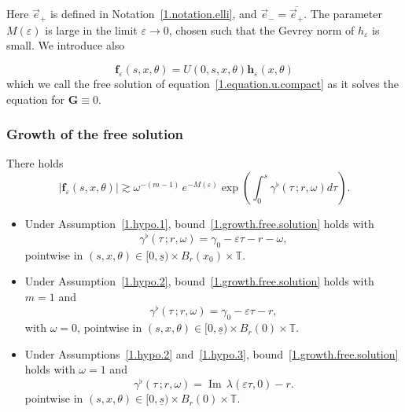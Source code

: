 \documentclass[AHL,Unicode,longabstracts,published]{cedram}
\theoremstyle{plain}
\newcommand*\e{\varepsilon}
\newcommand*\g{\gamma}
\newcommand*\f{{\mathbf f}}
\newcommand*\h{{\mathbf h}}
\newcommand*\und{\underline}
\DeclareMathOperator{\Imm}{Im}
\begin{document}
Here $\vec{e}_{+}$ is defined in Notation~\ref{1.notation.elli}, and $\vec{e}_{-} = \overline{\vec{e}_{+}}$. The parameter $M(\e)$ is large in the limit $\e\to 0$, chosen such that the Gevrey norm of $h_{\e}$ is small. We introduce also

\begin{equation}\label{1.free.solution}
\f_{\e}(s,x,\theta) = U(0,s,x,\theta) \h_{\e}(x,\theta)
\end{equation}
which we call the free solution of equation~\eqref{1.equation.u.compact} as it solves the equation for ${\mathbf G} \equiv 0$.


\subsubsection{Growth of the free solution}


\begin{lemm}\label{1.lemma.growth.free.solution}
There holds
\begin{equation}\label{1.growth.free.solution}
|\f_{\e}(s,x,\theta)| \gtrsim \omega^{-(m-1)}\,e^{-M(\e)}\exp\left(\int_{0}^{s} \g^{\flat}(\tau \,;r,\omega) d\tau \right).
\end{equation}


\begin{itemize}
\item Under Assumption~\ref{1.hypo.1}, bound~\eqref{1.growth.free.solution} holds with
\begin{equation}\label{1.bound.g.flat}
\g^{\flat}(\tau \,; r,\omega) = \g_0 - \e \tau - r - \omega,
\end{equation}
pointwise in $(s,x,\theta)\in[0,\und{s})\times B_r(x_0)\times\mathbb{T}$.

\item Under Assumption~\ref{1.hypo.2}, bound~\eqref{1.growth.free.solution} holds with $m=1$ and
\begin{equation}\label{1.bound.g.flat.bis}
\g^{\flat}(\tau \,; r,\omega) = \g_0 - \e \tau - r,
\end{equation}
with $\omega = 0$, pointwise in $(s,x,\theta)\in[0,\und{s})\times B_r(0)\times\mathbb{T}$.

\item Under Assumptions~\ref{1.hypo.2} and~\ref{1.hypo.3}, bound~\eqref{1.growth.free.solution} holds with $\omega = 1$ and
\begin{equation}\label{1.bound.g.flat.max}
\g^{\flat}(\tau \,; r,\omega) = {\Imm}\,\lambda(\e\tau,0) - r.
\end{equation}
pointwise in $(s,x,\theta)\in[0,\und{s})\times B_r(0)\times\mathbb{T}$.
\end{itemize}
\end{lemm}
\end{document}
